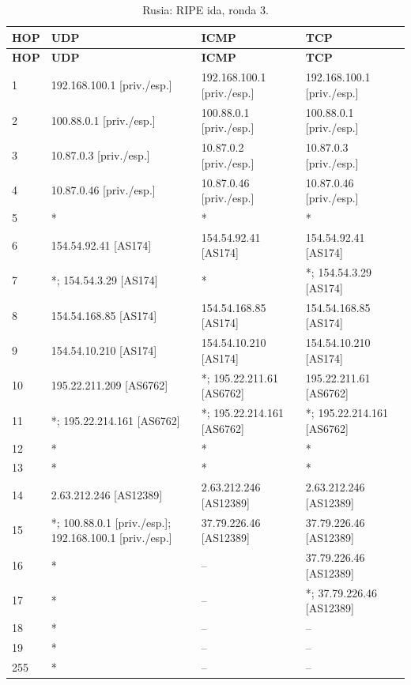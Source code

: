 \begingroup
\fontsize{9}{11}\selectfont
\begin{longtable}{p{0.95cm}p{4.716666666666667cm}p{4.716666666666667cm}p{4.716666666666667cm}}
\caption{Rusia: RIPE ida, ronda 3.}\label{anexo:ripe:37.79.226.46:3} \\
\toprule
\textbf{HOP} & \textbf{UDP} & \textbf{ICMP} & \textbf{TCP} \\ \midrule
\endfirsthead
\toprule
\textbf{HOP} & \textbf{UDP} & \textbf{ICMP} & \textbf{TCP} \\ \midrule
\endhead
1 & 192.168.100.1 [priv./esp.] & 192.168.100.1 [priv./esp.] & 192.168.100.1 [priv./esp.] \\
2 & 100.88.0.1 [priv./esp.] & 100.88.0.1 [priv./esp.] & 100.88.0.1 [priv./esp.] \\
3 & 10.87.0.3 [priv./esp.] & 10.87.0.2 [priv./esp.] & 10.87.0.3 [priv./esp.] \\
4 & 10.87.0.46 [priv./esp.] & 10.87.0.46 [priv./esp.] & 10.87.0.46 [priv./esp.] \\
5 & * & * & * \\
6 & 154.54.92.41 [AS174] & 154.54.92.41 [AS174] & 154.54.92.41 [AS174] \\
7 & *; 154.54.3.29 [AS174] & * & *; 154.54.3.29 [AS174] \\
8 & 154.54.168.85 [AS174] & 154.54.168.85 [AS174] & 154.54.168.85 [AS174] \\
9 & 154.54.10.210 [AS174] & 154.54.10.210 [AS174] & 154.54.10.210 [AS174] \\
10 & 195.22.211.209 [AS6762] & *; 195.22.211.61 [AS6762] & 195.22.211.61 [AS6762] \\
11 & *; 195.22.214.161 [AS6762] & *; 195.22.214.161 [AS6762] & *; 195.22.214.161 [AS6762] \\
12 & * & * & * \\
13 & * & * & * \\
14 & 2.63.212.246 [AS12389] & 2.63.212.246 [AS12389] & 2.63.212.246 [AS12389] \\
15 & *; 100.88.0.1 [priv./esp.]; 192.168.100.1 [priv./esp.] & 37.79.226.46 [AS12389] & 37.79.226.46 [AS12389] \\
16 & * & -- & 37.79.226.46 [AS12389] \\
17 & * & -- & *; 37.79.226.46 [AS12389] \\
18 & * & -- & -- \\
19 & * & -- & -- \\
255 & * & -- & -- \\
\bottomrule
\end{longtable}
